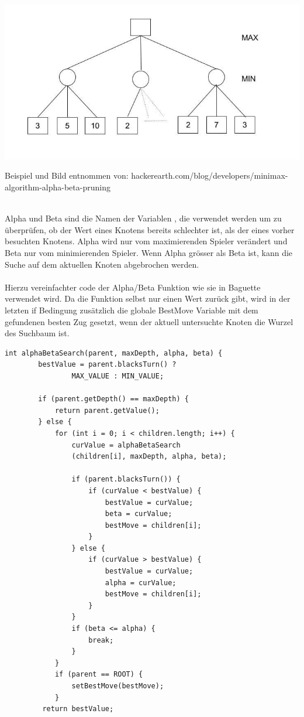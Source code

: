 \includegraphics[scale=0.5]{alpha-beta-pruning.jpg}\\
\begin{tiny}
Beispiel und Bild entnommen von: hackerearth.com/blog/developers/minimax-algorithm-alpha-beta-pruning
\end{tiny}\\
Alpha und Beta sind die Namen der Variablen , die verwendet werden um zu \"uberpr\"ufen, ob der Wert eines Knotens bereits schlechter ist, als der eines vorher besuchten Knotens.
Alpha wird nur vom maximierenden Spieler ver\"andert und Beta nur vom minimierenden Spieler.
Wenn Alpha gr\"osser als Beta ist, kann die Suche auf dem aktuellen Knoten abgebrochen werden.
\\\\
Hierzu vereinfachter code der Alpha/Beta Funktion wie sie in Baguette verwendet wird.
Da die Funktion selbst nur einen Wert zur\"uck gibt, wird in der letzten if Bedingung zus\"atzlich die globale BestMove Variable mit dem gefundenen besten Zug gesetzt, wenn der aktuell untersuchte Knoten die Wurzel des Suchbaum ist.
\begin{lstlisting}[frame=single]
int alphaBetaSearch(parent, maxDepth, alpha, beta) {
        bestValue = parent.blacksTurn() ?
                MAX_VALUE : MIN_VALUE;

        if (parent.getDepth() == maxDepth) {
            return parent.getValue();
        } else {
            for (int i = 0; i < children.length; i++) {
                curValue = alphaBetaSearch
                (children[i], maxDepth, alpha, beta);

                if (parent.blacksTurn()) {
                    if (curValue < bestValue) {
                        bestValue = curValue;
                        beta = curValue;
                        bestMove = children[i];
                    }
                } else {
                    if (curValue > bestValue) {
                        bestValue = curValue;
                        alpha = curValue;
                        bestMove = children[i];
                    }
                }
                if (beta <= alpha) {
                    break;
                }
            }
            if (parent == ROOT) {
                setBestMove(bestMove);
            }
         return bestValue;
\end{lstlisting}

